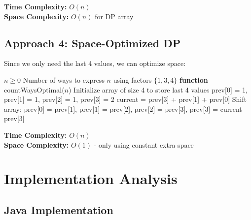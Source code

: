 \documentclass[12pt,a4paper]{article}
\begin{document}
\textbf{Time Complexity:} $O(n)$ \\
\textbf{Space Complexity:} $O(n)$ for DP array

\subsection{Approach 4: Space-Optimized DP}

Since we only need the last 4 values, we can optimize space:

\begin{algorithm}
\caption{Number Factor - Space Optimized}
\begin{algorithmic}
\REQUIRE $n \geq 0$
\ENSURE Number of ways to express $n$ using factors $\{1, 3, 4\}$
\STATE \textbf{function} countWaysOptimal($n$)
\ENDIF
\STATE Initialize array of size 4 to store last 4 values
\STATE prev[0] = 1, prev[1] = 1, prev[2] = 1, prev[3] = 2
    \STATE current = prev[3] + prev[1] + prev[0]
    \STATE Shift array: prev[0] = prev[1], prev[1] = prev[2], prev[2] = prev[3], prev[3] = current
\ENDFOR
\RETURN prev[3]
\end{algorithmic}
\end{algorithm}

\textbf{Time Complexity:} $O(n)$ \\
\textbf{Space Complexity:} $O(1)$ - only using constant extra space

\section{Implementation Analysis}

\subsection{Java Implementation}
\end{document}
